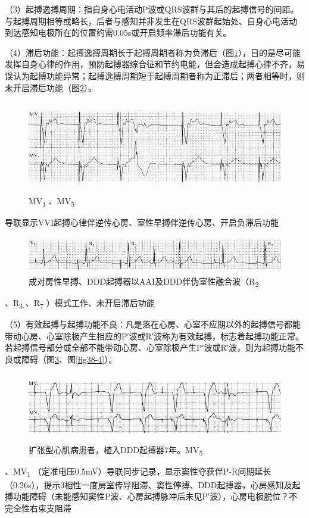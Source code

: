 （3）起搏逸搏周期：指自身心电活动P波或QRS波群与其后的起搏信号的间距。与起搏周期相等或略长，后者与感知并非发生在QRS波群起始处、自身心电活动到达感知电极所在的位置约需0.05s或开启频率滞后功能有关。

（4）滞后功能：起搏逸搏周期长于起搏周期者称为负滞后（图\ref{fig38-1}），目的是尽可能发挥自身心律的作用，预防起搏器综合征和节约电能，但会造成起搏心律不齐，易误认为起搏功能异常；起搏逸搏周期短于起搏周期者称为正滞后；两者相等时，则未开启滞后功能（图\ref{fig38-2}）。

\begin{figure}[!htbp]
 \centering
 \includegraphics[width=5.58333in,height=1.58333in]{./images/Image00604.jpg}
 \captionsetup{justification=centering}
 \caption{MV\textsubscript{1} 、MV\textsubscript{5}}
 \label{fig38-1}
  \end{figure} 
导联显示VVI起搏心律伴逆传心房、室性早搏伴逆传心房、开启负滞后功能

\begin{figure}[!htbp]
 \centering
 \includegraphics[width=5.58333in,height=0.63542in]{./images/Image00605.jpg}
 \captionsetup{justification=centering}
 \caption{成对房性早搏、DDD起搏器以AAI及DDD伴伪室性融合波（R\textsubscript{2}}
 \label{fig38-2}
  \end{figure} 
、R\textsubscript{3} 、R\textsubscript{7} ）模式工作、未开启滞后功能

（5）有效起搏与起搏功能不良：凡是落在心房、心室不应期以外的起搏信号都能带动心房、心室除极产生相应的P′波或R′波称为有效起搏，标志着起搏功能正常。若起搏信号部分或全部不能带动心房、心室除极产生P′波或R′波，则为起搏功能不良或障碍（图\ref{fig38-3}、图\ref{fig38-4}）。

\begin{figure}[!htbp]
 \centering
 \includegraphics[width=5.58333in,height=1.1875in]{./images/Image00606.jpg}
 \captionsetup{justification=centering}
 \caption{扩张型心肌病患者，植入DDD起搏器7年。MV\textsubscript{5}}
 \label{fig38-3}
  \end{figure} 
、MV\textsubscript{1}
（定准电压0.5mV）导联同步记录，显示窦性夺获伴P-R间期延长（0.26s），提示3相性一度房室传导阻滞、窦性停搏、DDD起搏器，心房感知及起搏功能障碍（未能感知窦性P波、心房起搏脉冲后未见P′波），心房电极脱位？不完全性右束支阻滞

